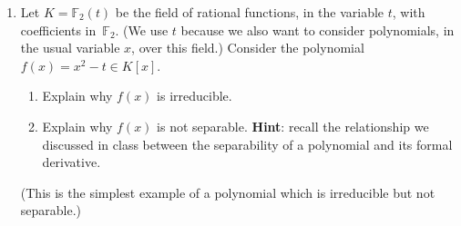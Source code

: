 \documentclass[11pt]{article}
\begin{document}
\begin{enumerate}
\item Let $K=\mathbb{F}_2(t)$ be the field of rational functions, in the variable $t$, with coefficients in~$\mathbb{F}_2$. (We use $t$ because we also want to consider polynomials, in the usual variable $x$, over this field.) Consider the polynomial $f(x) = x^2 - t \in K[x]$.
\begin{enumerate}
\item Explain why $f(x)$ is irreducible.
\item Explain why $f(x)$ is not separable. {\bf Hint}: recall the relationship we discussed in class between the separability of a polynomial and its formal derivative.
\end{enumerate}
(This is the simplest example of a polynomial which is irreducible but not separable.)
\end{enumerate}
\end{document}
